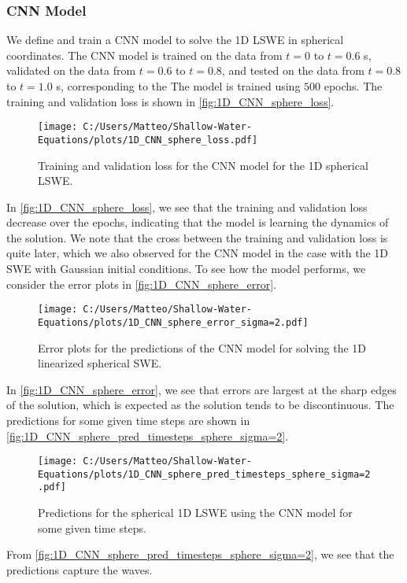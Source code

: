 \subsubsection*{CNN Model}
We define and train a CNN model to solve the 1D LSWE in spherical coordinates.
The CNN model is trained on the data from $t = 0$ to $t = 0.6$ s, validated on the data from $t = 0.6$ to $t = 0.8$, and tested on the data from $t = 0.8$ to $t = 1.0$ s, corresponding to the 
The model is trained using $500$ epochs.
The training and validation loss is shown in \autoref{fig:1D_CNN_sphere_loss}.
\begin{figure}[H]
    \centering
    \texttt{[image: C:/Users/Matteo/Shallow-Water-Equations/plots/1D\_CNN\_sphere\_loss.pdf]}
    \caption{Training and validation loss for the CNN model for the 1D spherical LSWE.}\label{fig:1D_CNN_sphere_loss}
\end{figure}
In \autoref{fig:1D_CNN_sphere_loss}, we see that the training and validation loss decrease over the epochs, indicating that the model is learning the dynamics of the solution.
We note that the cross between the training and validation loss is quite later, which we also observed for the CNN model in the case with the 1D SWE with Gaussian initial conditions.
To see how the model performs, we consider the error plots in \autoref{fig:1D_CNN_sphere_error}.
\begin{figure}[H]
    \centering
    \texttt{[image: C:/Users/Matteo/Shallow-Water-Equations/plots/1D\_CNN\_sphere\_error\_sigma=2.pdf]}
    \caption{Error plots for the predictions of the CNN model for solving the 1D linearized spherical SWE.}\label{fig:1D_CNN_sphere_error}
\end{figure}
In \autoref{fig:1D_CNN_sphere_error}, we see that errors are largest at the sharp edges of the solution, which is expected as the solution tends to be discontinuous.
The predictions for some given time steps are shown in \autoref{fig:1D_CNN_sphere_pred_timesteps_sphere_sigma=2}.
\begin{figure}[H]
    \centering
    \texttt{[image: C:/Users/Matteo/Shallow-Water-Equations/plots/1D\_CNN\_sphere\_pred\_timesteps\_sphere\_sigma=2.pdf]}
    \caption{Predictions for the spherical 1D LSWE using the CNN model for some given time steps.}\label{fig:1D_CNN_sphere_pred_timesteps_sphere_sigma=2}
\end{figure}
From \autoref{fig:1D_CNN_sphere_pred_timesteps_sphere_sigma=2}, we see that the predictions capture the waves.%


